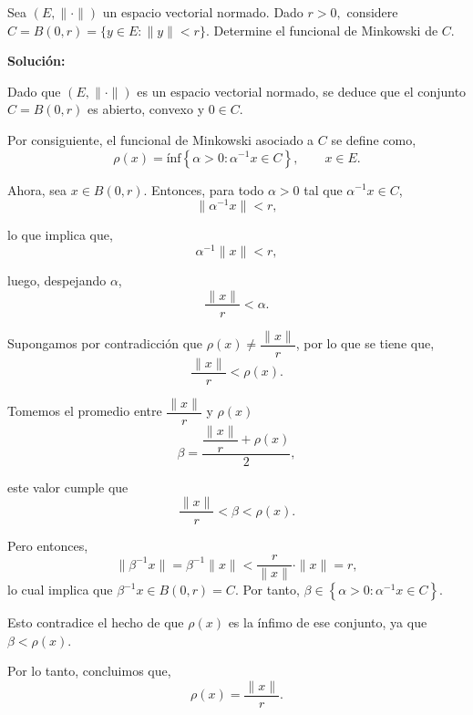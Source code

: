 Sea $(E,\|\cdot\|)$ un espacio vectorial normado. Dado $r>0,$ considere $C=B(0,r)=\{y\in E:\|y\|<r\}.$ Determine el funcional de Minkowski de $C.$


\textbf{Solución:}

Dado que $(E, \| \cdot \|)$ es un espacio vectorial normado, se deduce que el conjunto $C = B(0,r)$ es abierto, convexo y  $0 \in C$.

Por consiguiente, el funcional de Minkowski asociado a $C$ se define como,
\[
\rho(x) = \text{ínf} \left\{ \alpha > 0 : \alpha^{-1}x \in C \right\}, \qquad x \in E.
\]

Ahora, sea $x \in B(0,r)$. Entonces, para todo $\alpha > 0$ tal que $\alpha^{-1}x \in C$, 
\[
\| \alpha^{-1}x \| < r,
\]

lo que implica que,
\[
\alpha^{-1} \| x \| < r,
\]

luego, despejando $\alpha$, 
\[
\frac{\| x \|}{r} < \alpha.
\]


Supongamos por contradicción que $\rho(x) \neq \dfrac{\| x \|}{r}$, por lo que se tiene que,
\[
\frac{\| x \|}{r} < \rho(x).
\]

Tomemos el promedio entre $\dfrac{\| x \|}{r}$ y $\rho(x)$
\[
\beta = \dfrac{\dfrac{\| x \|}{r} + \rho(x)}{2},
\]

este valor cumple que
\[
\frac{\| x \|}{r} < \beta < \rho(x).
\]

Pero entonces,
\[
\| \beta^{-1}x \| = \beta^{-1} \| x \| < \frac{r}{\| x \|} \cdot \| x \| = r,
\]
lo cual implica que $\beta^{-1}x \in B(0,r)=C$. Por tanto, $\beta \in \left\{ \alpha > 0 : \alpha^{-1}x \in C \right\}$.

Esto contradice el hecho de que $\rho(x)$ es la ínfimo de ese conjunto, ya que $\beta < \rho(x)$.

Por lo tanto, concluimos que,
\[
\rho(x) = \frac{\| x \|}{r}.
\]